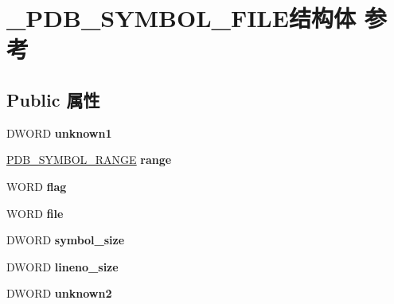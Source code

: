 \hypertarget{struct___p_d_b___s_y_m_b_o_l___f_i_l_e}{}\section{\+\_\+\+P\+D\+B\+\_\+\+S\+Y\+M\+B\+O\+L\+\_\+\+F\+I\+L\+E结构体 参考}
\label{struct___p_d_b___s_y_m_b_o_l___f_i_l_e}
\subsection*{Public 属性}
\begin{DoxyCompactItemize}
\item 
\mbox{\label{struct___p_d_b___s_y_m_b_o_l___f_i_l_e_a619de3208f46036a0a2f5d55251427ff}} 
D\+W\+O\+RD {\bfseries unknown1}
\item 
\mbox{\label{struct___p_d_b___s_y_m_b_o_l___f_i_l_e_a9ff043e067c0255543bb9634978ab930}} 
\hyperlink{struct___p_d_b___s_y_m_b_o_l___r_a_n_g_e}{P\+D\+B\+\_\+\+S\+Y\+M\+B\+O\+L\+\_\+\+R\+A\+N\+GE} {\bfseries range}
\item 
\mbox{\label{struct___p_d_b___s_y_m_b_o_l___f_i_l_e_ad44ffbba7531d6ac8ad660dfaa876267}} 
W\+O\+RD {\bfseries flag}
\item 
\mbox{\label{struct___p_d_b___s_y_m_b_o_l___f_i_l_e_aceeb1c7041f76343e3e53fa9056c8a32}} 
W\+O\+RD {\bfseries file}
\item 
\mbox{\label{struct___p_d_b___s_y_m_b_o_l___f_i_l_e_a500400b998f2527331520bfc64989f16}} 
D\+W\+O\+RD {\bfseries symbol\+\_\+size}
\item 
\mbox{\label{struct___p_d_b___s_y_m_b_o_l___f_i_l_e_aeba9cd1473e5c81c4db5a81ebd046aad}} 
D\+W\+O\+RD {\bfseries lineno\+\_\+size}
\item 
\mbox{\label{struct___p_d_b___s_y_m_b_o_l___f_i_l_e_a604c46723526a41efb8e3d4e93d825aa}} 
D\+W\+O\+RD {\bfseries unknown2}
\item 

\end{DoxyCompactItemize}
